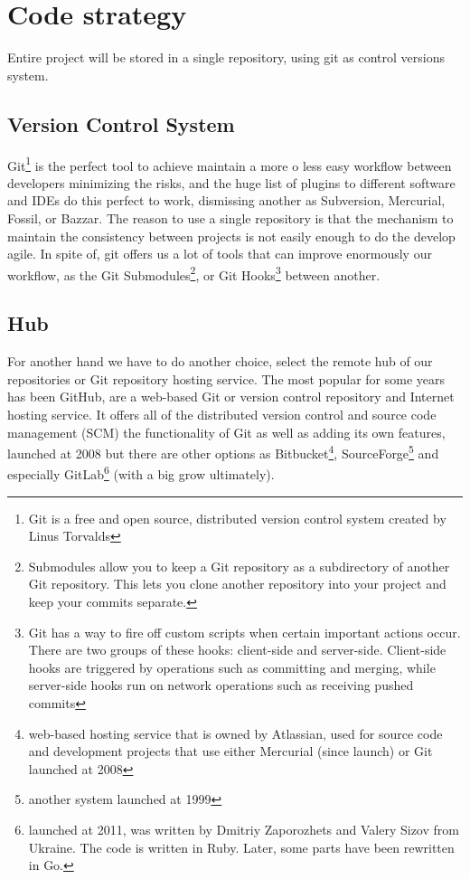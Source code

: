 \section{Code strategy}


Entire project will be stored in a single repository, using git as control
versions system.

\subsection{Version Control System}

Git\footnote{Git is a free and open source, distributed version control system
created by Linus Torvalds} is the perfect tool to achieve maintain a more o
less easy workflow between developers minimizing the risks, and the huge list of
plugins to different software and IDEs do this perfect to work, dismissing another
as Subversion, Mercurial, Fossil, or Bazzar.
\intro
The reason to use a single repository is that the mechanism to maintain the
consistency between projects is not easily enough to do the develop agile.
In spite of, git offers us a lot of tools that can improve enormously our
workflow, as the Git Submodules\footnote{Submodules allow you to keep a
Git repository as a subdirectory of another Git repository.
This lets you clone another repository into your project and keep your commits
separate.}, or Git Hooks\footnote{Git has a way to fire off custom scripts when
certain important actions occur. There are two groups of these hooks:
client-side and server-side. Client-side hooks are triggered by operations such
as committing and merging, while server-side hooks run on network operations
such as receiving pushed commits} between another.

\subsection{Hub}

For another hand we have to do another choice, select the remote hub of our repositories
or Git repository hosting service. The most popular for some years has been GitHub,
are a web-based Git or version control repository and Internet hosting service.
It offers all of the distributed version control and source code management (SCM)
the functionality of Git as well as adding its own features,
launched at 2008
but there are other options as Bitbucket\footnote{web-based hosting service
that is owned by Atlassian, used for source code and development projects that
use either Mercurial (since launch) or Git
launched at 2008},
SourceForge\footnote{another system launched at 1999} and especially
GitLab\footnote{launched at 2011, was written by Dmitriy Zaporozhets and Valery
Sizov from Ukraine. The code is written in Ruby. Later, some parts have been
rewritten in Go.} (with a big grow ultimately).


